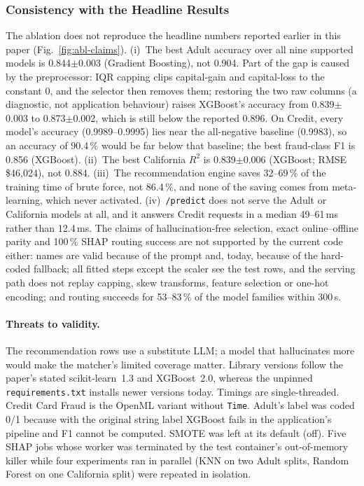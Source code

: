 \subsubsection{Consistency with the Headline Results}
The ablation does not reproduce the headline numbers reported earlier in this paper (Fig.~\ref{fig:abl-claims}). (i)~The best Adult accuracy over all nine supported models is 0.844$\pm$0.003 (Gradient Boosting), not 0.904. Part of the gap is caused by the preprocessor: IQR capping clips capital-gain and capital-loss to the constant 0, and the selector then removes them; restoring the two raw columns (a diagnostic, not application behaviour) raises XGBoost's accuracy from 0.839$\pm$0.003 to 0.873$\pm$0.002, which is still below the reported 0.896. On Credit, every model's accuracy (0.9989--0.9995) lies near the all-negative baseline (0.9983), so an accuracy of 90.4\,\% would be far below that baseline; the best fraud-class F1 is 0.856 (XGBoost). (ii)~The best California $R^2$ is 0.839$\pm$0.006 (XGBoost; RMSE \$46,024), not 0.884. (iii)~The recommendation engine saves 32--69\,\% of the training time of brute force, not 86.4\,\%, and none of the saving comes from meta-learning, which never activated. (iv)~\texttt{/predict} does not serve the Adult or California models at all, and it answers Credit requests in a median 49--61\,ms rather than 12.4\,ms. The claims of hallucination-free selection, exact online--offline parity and 100\,\% SHAP routing success are not supported by the current code either: names are valid because of the prompt and, today, because of the hard-coded fallback; all fitted steps except the scaler see the test rows, and the serving path does not replay capping, skew transforms, feature selection or one-hot encoding; and routing succeeds for 53--83\,\% of the model families within 300\,s.

\paragraph{Threats to validity.} The recommendation rows use a substitute LLM; a model that hallucinates more would make the matcher's limited coverage matter. Library versions follow the paper's stated scikit-learn~1.3 and XGBoost~2.0, whereas the unpinned \texttt{requirements.txt} installs newer versions today. Timings are single-threaded. Credit Card Fraud is the OpenML variant without \texttt{Time}. Adult's label was coded 0/1 because with the original string label XGBoost fails in the application's pipeline and F1 cannot be computed. SMOTE was left at its default (off). Five SHAP jobs whose worker was terminated by the test container's out-of-memory killer while four experiments ran in parallel (KNN on two Adult splits, Random Forest on one California split) were repeated in isolation.
\endgroup
